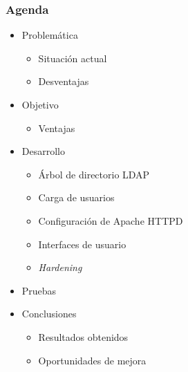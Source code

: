 \documentclass{beamer}
\title
  [\PresentationTitle \hspace{25em} \thepage] %
  {\PresentationTitle}                        %
\author{\AuthorName} %
\institute[\UniversityShortName] %
{
\small
\UniversityName \\ %
\medskip
\FacultyName \\
\medskip
\CollegeMajor
}
\date{\PresentationDate} %
\begin{document}
\begin{frame}
\titlepage
\end{frame}
\begin{frame}
\frametitle{Agenda}

\begin{itemize}
  \item Problem\'{a}tica
  \begin{itemize}
    \item Situaci\'{o}n actual
    \item Desventajas
  \end{itemize}
  \item Objetivo
  \begin{itemize}
    \item Ventajas
  \end{itemize}
  \item Desarrollo
  \begin{itemize}
    \item \'{A}rbol de directorio \textup{LDAP}
    \item Carga de usuarios
    \item Configuraci\'{o}n de Apache \textup{HTTPD}
    \item Interfaces de usuario
    \item \textsl{Hardening}
  \end{itemize}
  \item Pruebas
  \item Conclusiones
  \begin{itemize}
    \item Resultados obtenidos
    \item Oportunidades de mejora
  \end{itemize}
\end{itemize}

\end{frame}
\end{document}
